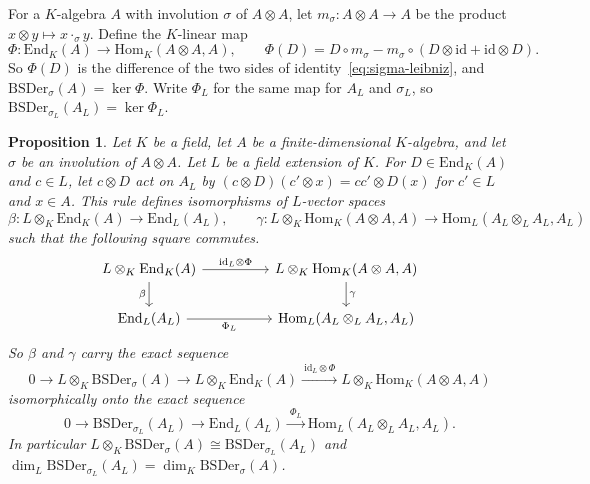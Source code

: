 \documentclass[]{interact}
\theoremstyle{plain}
\newtheorem{proposition}[theorem]{Proposition}
\theoremstyle{definition}
\theoremstyle{remark}
\newcommand{\BSDer}{\mathrm{BSDer}}
\begin{document}
For a $K$-algebra $A$ with involution $\sigma$ of $A \otimes A$, let $m_\sigma \colon A \otimes A \to A$ be the product $x \otimes y \mapsto x \cdot_\sigma y$.
Define the $K$-linear map
\[
\Phi \colon \mathrm{End}_K(A) \to \mathrm{Hom}_K(A \otimes A, A), \qquad
\Phi(D) = D \circ m_\sigma - m_\sigma \circ (D \otimes \mathrm{id} + \mathrm{id} \otimes D).
\]
So $\Phi(D)$ is the difference of the two sides of identity~\eqref{eq:sigma-leibniz}, and $\BSDer_\sigma(A) = \ker \Phi$.
Write $\Phi_L$ for the same map for $A_L$ and $\sigma_L$, so $\BSDer_{\sigma_L}(A_L) = \ker \Phi_L$.

\begin{proposition}\label{prop:base-change}
Let $K$ be a field, let $A$ be a finite-dimensional $K$-algebra, and let $\sigma$ be an involution of $A \otimes A$.
Let $L$ be a field extension of $K$.
For $D \in \mathrm{End}_K(A)$ and $c \in L$, let $c \otimes D$ act on $A_L$ by $(c \otimes D)(c' \otimes x) = cc' \otimes D(x)$ for $c' \in L$ and $x \in A$.
This rule defines isomorphisms of $L$-vector spaces
\[
\beta \colon L \otimes_K \mathrm{End}_K(A) \to \mathrm{End}_L(A_L), \qquad
\gamma \colon L \otimes_K \mathrm{Hom}_K(A \otimes A, A) \to \mathrm{Hom}_L(A_L \otimes_L A_L, A_L)
\]
such that the following square commutes.
\[
\begin{tikzcd}[column sep=huge]
L \otimes_K \mathrm{End}_K(A) \arrow[r, "\mathrm{id}_L \otimes \Phi"] \arrow[d, "\beta"'] & L \otimes_K \mathrm{Hom}_K(A \otimes A, A) \arrow[d, "\gamma"] \\
\mathrm{End}_L(A_L) \arrow[r, "\Phi_L"'] & \mathrm{Hom}_L(A_L \otimes_L A_L, A_L)
\end{tikzcd}
\]
So $\beta$ and $\gamma$ carry the exact sequence
\[
0 \to L \otimes_K \BSDer_\sigma(A) \to L \otimes_K \mathrm{End}_K(A) \xrightarrow{\ \mathrm{id}_L \otimes \Phi\ } L \otimes_K \mathrm{Hom}_K(A \otimes A, A)
\]
isomorphically onto the exact sequence
\[
0 \to \BSDer_{\sigma_L}(A_L) \to \mathrm{End}_L(A_L) \xrightarrow{\ \Phi_L\ } \mathrm{Hom}_L(A_L \otimes_L A_L, A_L).
\]
In particular $L \otimes_K \BSDer_\sigma(A) \cong \BSDer_{\sigma_L}(A_L)$ and $\dim_L \BSDer_{\sigma_L}(A_L) = \dim_K \BSDer_\sigma(A)$.
\end{proposition}
\end{document}
